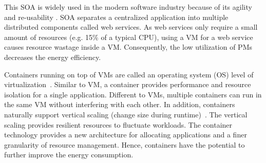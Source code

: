 

 This SOA is widely used in the modern software industry because of its agility and re-usability \cite{Sprott:2004wt}.
SOA separates a centralized application into multiple distributed components called web services. 
As web services only require a small amount of resources (e.g. 15\% of a typical CPU), 
using a VM for a web service causes resource wastage inside a VM. Consequently, the low utilization of PMs decreases
the energy efficiency.


 Containers running on top of 
VMs are called an operating system (OS) level of virtualization~\cite{Soltesz:2007cu}. Similar to VM, 
a container provides performance and resource isolation for a single application. 
Different to VMs, multiple containers can run in the same VM without interfering with each other. 
In addition, containers naturally support vertical scaling (change size during runtime)~\cite{Vaquero:2011gb}. 
The vertical scaling provides resilient resources to fluctuate workloads. The container technology provides a new 
architecture for allocating applications and a finer granularity of resource management. Hence, containers have the potential to further
improve the energy consumption.



